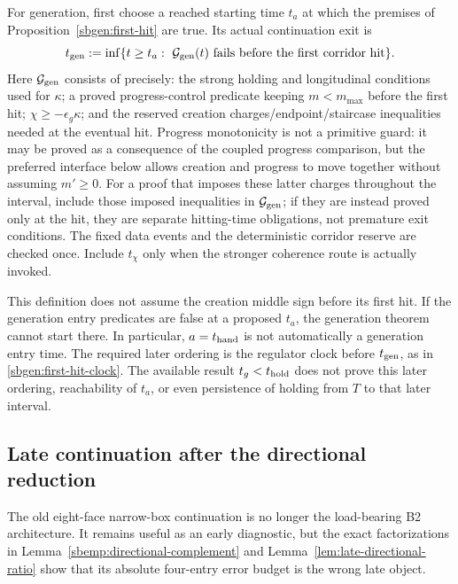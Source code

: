 \documentclass{article} %
\theoremstyle{plain}
\theoremstyle{definition}
\theoremstyle{remark}
\begin{document}
For generation, first choose a reached starting time $t_a$ at which the
premises of Proposition~\ref{sbgen:first-hit} are true. Its actual
continuation exit is
\begin{equation}\label{sbguard:generation-exit}
 t_{\rm gen}:=\inf\{t\ge t_a:\ \mathcal G_{\rm gen}(t)
                         \text{ fails before the first corridor hit}\}.
\end{equation}
Here $\mathcal G_{\rm gen}$ consists of precisely: the strong holding
and longitudinal conditions used for $\kappa$; a proved progress-control
predicate keeping $m<m_{\max}$ before the first hit; $\chi\ge-\epsilon_g\kappa$;
and the reserved creation charges/endpoint/staircase inequalities needed at
the eventual hit.  Progress monotonicity is not a primitive guard: it may be
proved as a consequence of the coupled progress comparison, but the preferred
interface below allows creation and progress to move together without
assuming $m'\ge0$.
For a proof that imposes these latter charges throughout the interval,
include those imposed inequalities in $\mathcal G_{\rm gen}$; if they
are instead proved only at the hit, they are separate hitting-time
obligations, not premature exit conditions. The fixed data events and
the deterministic corridor reserve are checked once. Include $t_\chi$
only when the stronger coherence route is actually invoked.

This definition does not assume the creation middle sign before its
first hit. If the generation entry predicates are false at a proposed
$t_a$, the generation theorem cannot start there. In particular,
$a=t_{\rm hand}$ is not automatically a generation entry time.
The required later ordering is the regulator clock before
$t_{\rm gen}$, as in \eqref{sbgen:first-hit-clock}. The available result
$t_g<t_{\rm hold}$ does not prove this later ordering, reachability of
$t_a$, or even persistence of holding from $T$ to that later interval.

\subsection{Late continuation after the directional reduction}

The old eight-face narrow-box continuation is no longer the load-bearing B2
architecture.  It remains useful as an early diagnostic, but the exact
factorizations in Lemma~\ref{sbemp:directional-complement} and
Lemma~\ref{lem:late-directional-ratio} show that its absolute four-entry error
budget is the wrong late object.
\end{document}
